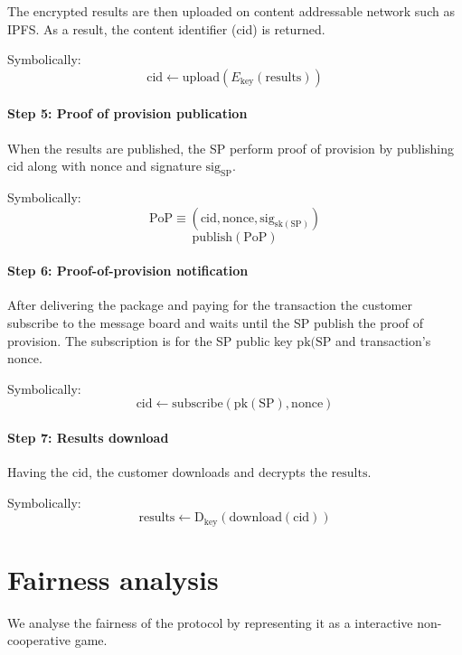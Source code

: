 \documentclass{ieeeaccess}
\begin{document}
The encrypted results are then uploaded on content addressable network such as IPFS. As a result, the content identifier (cid) is returned.

Symbolically: 
\[
\mathrm{cid} \gets \mathrm{upload}(E_{\mathrm{key}}(\mathrm{results}))
\]

\paragraph{Step 5: Proof of provision publication}\label{step-5-proof-of-provision-publication}

When the results are published, the SP perform proof of provision by publishing $\mathrm{cid}$ along with $\mathrm{nonce}$ and signature $\mathrm{sig}_\mathrm{SP}$.

Symbolically: 
\[\mathrm{PoP} \equiv (\mathrm{cid}, \mathrm{nonce}, \mathrm{sig}_{\mathrm{sk}(\mathrm{SP})})\]
\[\mathrm{publish}(\mathrm{PoP})\]

\paragraph{Step 6: Proof-of-provision notification}\label{step-6-proof-of-provision-notification}

After delivering the package and paying for the transaction the customer subscribe to the message board and waits until the SP publish the proof of provision. The subscription is for the SP public key $\mathrm{pk}(\mathrm{SP}$ and transaction's $\mathrm{nonce}$.

Symbolically: \[
\mathrm{cid} \gets \mathrm{subscribe}(\mathrm{pk}(\mathrm{SP}), \mathrm{nonce})
\]

\paragraph{Step 7: Results download}\label{step-7-results-download} Having the $\mathrm{cid}$, the customer downloads and decrypts the $\mathrm{results}$.

Symbolically: \[
\mathrm{results} \gets \mathrm{D}_{\mathrm{key}}(\mathrm{download}(\mathrm{cid}))
\]


\section{Fairness analysis}\label{sec:fairness-analysis}

We analyse the fairness of the protocol by representing it as a interactive non-cooperative game.
\end{document}
